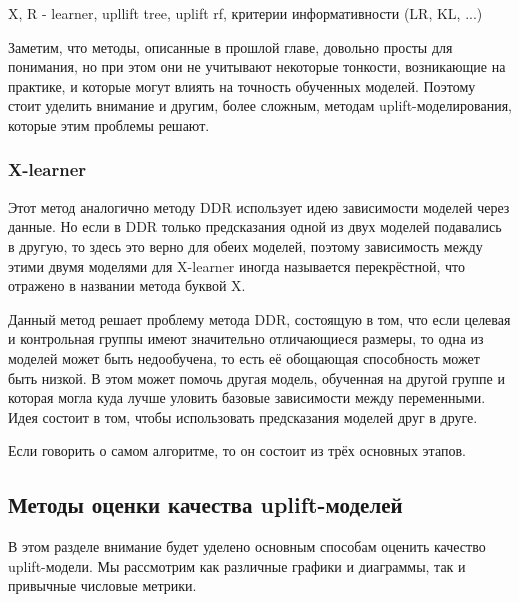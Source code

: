 X, R - learner, upllift tree, uplift rf, критерии информативности (LR, KL, ...)

Заметим, что методы, описанные в прошлой главе, довольно просты для понимания, но при этом они не учитывают некоторые тонкости, возникающие на практике, и которые могут влиять на точность обученных моделей. Поэтому стоит уделить внимание и другим, более сложным, методам uplift-моделирования, которые этим проблемы решают.

\subsubsection*{X-learner}

Этот метод аналогично методу DDR использует идею зависимости моделей через данные. Но если в DDR только предсказания одной из двух моделей подавались в другую, то здесь это верно для обеих моделей, поэтому зависимость между этими двумя моделями для X-learner иногда называется перекрёстной, что отражено в названии метода буквой X.

Данный метод решает проблему метода DDR, состоящую в том, что если целевая и контрольная группы имеют значительно отличающиеся размеры, то одна из моделей может быть недообучена, то есть её обощающая способность может быть низкой. В этом может помочь другая модель, обученная на другой группе и которая могла куда лучше уловить базовые зависимости между переменными. Идея состоит в том, чтобы использовать предсказания моделей друг в друге.

Если говорить о самом алгоритме, то он состоит из трёх основных этапов.























\subsection{Методы оценки качества uplift-моделей}

В этом разделе внимание будет уделено основным способам оценить качество uplift-модели. Мы рассмотрим как различные графики и диаграммы, так и привычные числовые метрики.

